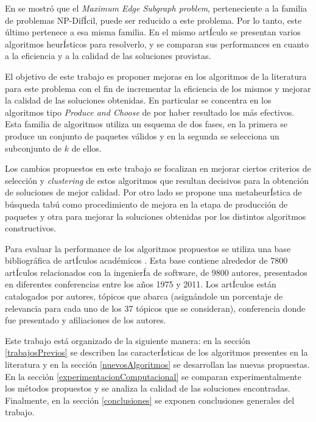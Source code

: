 En \cite{compositeRetrival} se mostró que el {\em Maximum Edge Subgraph problem}, perteneciente a la familia de problemas NP-DifÍcil, puede ser reducido a este problema. Por lo tanto, este último pertenece a esa misma familia. En el mismo artÍculo se presentan varios algoritmos heurÍsticos para resolverlo, y se comparan sus performances en cuanto a la eficiencia y a la calidad de las soluciones provistas.   

El objetivo de este trabajo es proponer mejoras en los algoritmos de la literatura para este problema con el fin de incrementar la eficiencia de los mismos y mejorar la calidad de las soluciones obtenidas. En particular se concentra en los algoritmos tipo {\em Produce and Choose} de \cite{compositeRetrival} por haber resultado los más efectivos. Esta familia de algoritmos utiliza un esquema de dos fases, en la primera se produce un conjunto de paquetes válidos y en la segunda se selecciona un subconjunto de $k$ de ellos.

Los cambios propuestos en este trabajo se focalizan en mejorar ciertos criterios de selección y {\em clustering} de estos algoritmos que resultan decisivos para la obtención de soluciones de mejor calidad. Por otro lado se propone una metaheurÍstica de búsqueda tabú como procedimiento de mejora en la etapa de producción de paquetes y otra para mejorar la soluciones obtenidas por los distintos algoritmos constructivos.
 
Para evaluar la performance de los algoritmos propuestos se utiliza una base bibliográfica de artÍculos académicos \cite{dataDrive}. Esta base contiene alrededor de 7800 artÍculos relacionados con la ingenierÍa de software, de 9800 autores, presentados en diferentes conferencias entre los años 1975 y 2011. Los artÍculos están catalogados por autores, tópicos que abarca (asignándole un porcentaje de relevancia para cada uno de los 37 tópicos que se consideran), conferencia donde fue presentado y afiliaciones de los autores. 

Este trabajo está organizado de la siguiente manera: en la sección \ref{trabajosPrevios} se describen las caracterÍsticas de los algoritmos presentes en la literatura y en la sección \ref{nuevosAlgoritmos} se desarrollan las nuevas propuestas. En la sección \ref{experimentacionComputacional} se comparan experimentalmente los métodos propuestos y se analiza la calidad de las soluciones encontradas. Finalmente, en la sección \ref{conclusiones} se exponen conclusiones generales del trabajo.

